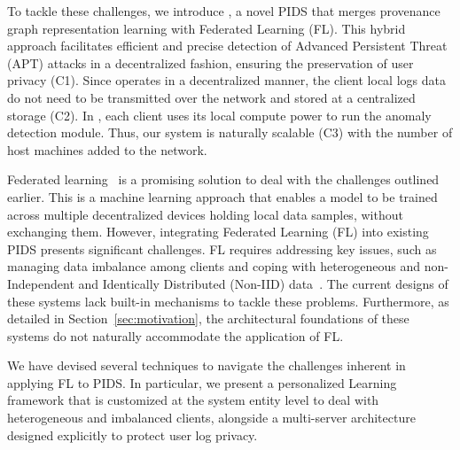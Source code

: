 
To tackle these challenges, we introduce \Sys, a novel PIDS that merges provenance graph representation learning with Federated Learning (FL). This hybrid approach facilitates efficient and precise detection of Advanced Persistent Threat (APT) attacks in a decentralized fashion, ensuring the preservation of user privacy (C1). Since \Sys operates in a decentralized manner, the client local logs data do not need to be transmitted over the network and stored at a centralized storage (C2). In \Sys, each client uses its local compute power to run the \Sys anomaly detection module. Thus, our system is naturally scalable (C3) with the number of host machines added to the network.


Federated learning~\cite{mcmahan2017communication} is a promising solution to deal with the challenges outlined earlier. This is a machine learning approach that enables a model to be trained across multiple decentralized devices holding local data samples, without exchanging them. However, integrating Federated Learning (FL) into existing PIDS presents significant challenges. FL requires addressing key issues, such as managing data imbalance among clients and coping with heterogeneous and non-Independent and Identically Distributed (Non-IID) data~\cite{zhao2018federated}. The current designs of these systems lack built-in mechanisms to tackle these problems. Furthermore, as detailed in Section~\ref{sec:motivation}, the architectural foundations of these systems do not naturally accommodate the application of FL.

We have devised several techniques to navigate the challenges inherent in applying FL to PIDS. In particular, we present a personalized \gnnshort Learning framework that is customized at the system entity level to deal with heterogeneous and imbalanced clients, alongside a multi-server architecture designed explicitly to protect user log privacy.


